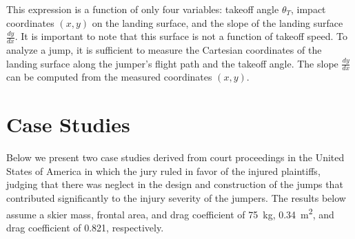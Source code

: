\documentclass{article}
\begin{document}
This expression is  a function of only four variables: takeoff angle $\theta_T$,
impact coordinates $(x,y)$ on the landing surface, and the slope of the landing
surface $\frac{dy}{dx}$. It is important to note that this surface is not a
function of takeoff speed. To analyze a jump, it is sufficient to measure the
Cartesian coordinates of the landing surface along the jumper's flight path and
the takeoff angle. The slope $\frac{dy}{dx}$ can be computed from the measured
coordinates $(x,y)$.

\section{Case Studies}
%
Below we present two case studies derived from court proceedings in the United
States of America in which the jury ruled in favor of the injured plaintiffs,
judging that there was neglect in the design and construction of the jumps that
contributed significantly to the injury severity of the jumpers. The results
below assume a skier mass, frontal area, and drag coefficient of 75~\si{\kg},
0.34~\si{\meter\squared}, and drag coefficient of 0.821, respectively.
\end{document}
